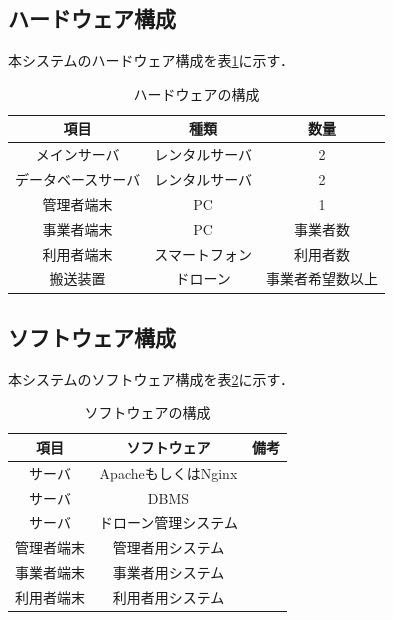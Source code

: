 \documentclass[a4paper, titlepage]{jsarticle}
\begin{document}
\subsection{ハードウェア構成}
本システムのハードウェア構成を表\ref{fig:hardware}に示す．
\begin{table}[H]
  \begin{center}
    \caption{ハードウェアの構成}
    \label{fig:hardware}
    \begin{tabular}{ccc} \hline
      項目        & 種類      & 数量       \\ \hline \hline
      メインサーバ    & レンタルサーバ & 2        \\
      データベースサーバ & レンタルサーバ & 2        \\
      管理者端末     & PC      & 1        \\
      事業者端末     & PC      & 事業者数     \\
      利用者端末     & スマートフォン & 利用者数     \\
      搬送装置      & ドローン    & 事業者希望数以上 \\ \hline
    \end{tabular}
  \end{center}
\end{table}
\subsection{ソフトウェア構成}
本システムのソフトウェア構成を表\ref{fig:software}に示す．
\begin{table}[H]
  \begin{center}
    \caption{ソフトウェアの構成}
    \label{fig:software}
    \begin{tabular}{ccc} \hline
      項目           & ソフトウェア & 備考     \\ \hline \hline
      サーバ       & ApacheもしくはNginx &        \\
      サーバ & DBMS  &        \\
      サーバ & ドローン管理システム & \\
      管理者端末        & 管理者用システム &   \\
      事業者端末        & 事業者用システム &         \\
      利用者端末        & 利用者用システム & \\ \hline
    \end{tabular}
  \end{center}
\end{table}
\end{document}
